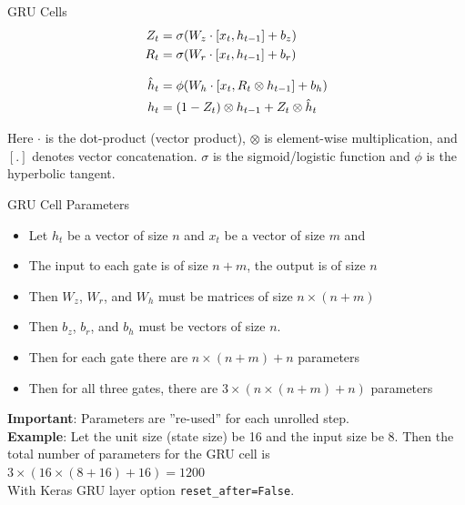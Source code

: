 \documentclass[ignorenonframetext,xcolor=x11names]{beamer}
\begin{document}
\begin{frame}[label=full]{GRU Cells}
\begin{align*}
Z_t &= \sigma (W_z \cdot [x_t, h_{t-1}] + b_z) \\
R_t &= \sigma (W_r \cdot [x_t, h_{t-1}] + b_r) \\[.5\baselineskip]
\hat{h}_t &= \phi (W_h \cdot [x_t, R_t \otimes h_{t-1}] + b_h) \\
h_t &= (1 - Z_t) \otimes h_{t-1} + Z_t \otimes \hat{h}_t
\end{align*}

\small
Here $\cdot$ is the dot-product (vector product), $\otimes$ is element-wise multiplication, and $[.]$ denotes vector concatenation.  $\sigma$ is the sigmoid/logistic function and $\phi$ is the hyperbolic tangent.
\end{frame}

\begin{frame}[label=full]{GRU Cell Parameters}
\small
\begin{itemize}
  \item Let $h_t$ be a vector of size $n$ and $x_t$ be a vector of size $m$ and 
  \item The input to each gate is of size $n+m$, the output is of size $n$
  \item Then $W_z$, $W_r$, and $W_h$ must be matrices of size $n \times (n+m)$
  \item Then $b_z$, $b_r$, and $b_h$ must be vectors of size $n$. 
  \item Then for each gate there are $n \times (n+m) + n$ parameters
  \item Then for all three gates, there are $3 \times (n \times (n+m) + n)$ parameters
\end{itemize}
\textbf{Important}: Parameters are ''re-used'' for each unrolled step.\\

\textbf{Example}: Let the unit size (state size) be 16 and the input size be 8. Then the total number of parameters for the GRU cell is $3 \times (16 \times (8+16) + 16) = 1200$ \\
{\tiny With Keras GRU layer option \texttt{reset\_after=False}.}
\end{frame}
\end{document}
